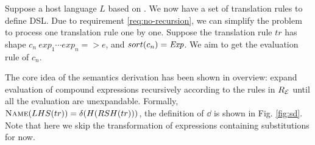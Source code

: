 
Suppose a host language $L$ based on \STLC{}. %
We now have a set of translation rules to define DSL.
Due to requirement \ref{req:no-recursion},
 we can simplify the problem to process one translation rule one by one.
Suppose the translation rule $tr$ has shape $c_n~exp_1\cdots exp_n => e$,
 and $sort(c_n)=\mathit{Exp}$.
We aim to get the evaluation rule of $c_n$.

The core idea of the semantics derivation has been shown in overview:
 expand evaluation of compound expressions recursively according to the rules in $R_{\mathcal{E}}$
 until all the evaluation are unexpandable.
Formally, $\textsc{Name}({LHS(tr)})=\delta(H(RSH(tr)))$, the definition of $\dd$ is shown in Fig. \ref{fig:sd}.
Note that here we skip the transformation of expressions containing substitutions for now.

